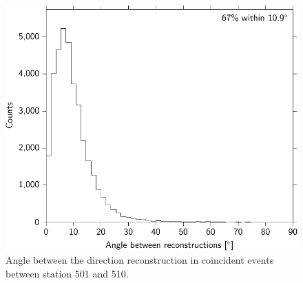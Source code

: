 \begin{figure}
    \centering
    \includegraphics{plots/station/angle_between_501_510_minn2}
    \caption{Angle between the direction reconstruction in coincident events between station 501 and 510.}
    \label{fig:angle_between_501_510}
\end{figure}

